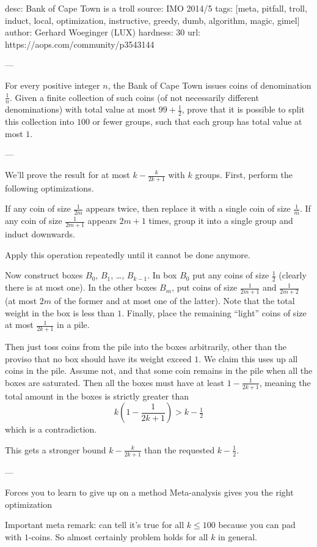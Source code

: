 desc:  Bank of Cape Town is a troll
source:  IMO 2014/5
tags:  [meta, pitfall, troll, induct, local, optimization, instructive, greedy, dumb, algorithm, magic, gimel]
author: Gerhard Woeginger (LUX)
hardness: 30
url: https://aops.com/community/p3543144

---

For every positive integer $n$,
the Bank of Cape Town issues coins of denomination $\frac 1n$.
Given a finite collection of such coins (of not necessarily different denominations)
with total value at most $99 + \frac12$, prove that it is possible to split
this collection into $100$ or fewer groups, such that each group has total value at most $1$.

---

We'll prove the result
for at most $k - \frac{k}{2k+1}$ with $k$ groups.
First, perform the following optimizations.
\begin{itemize}
 \ii If any coin of size $\frac{1}{2m}$ appears twice,
 then replace it with a single coin of size $\frac{1}{m}$.
 \ii If any coin of size $\frac{1}{2m+1}$ appears $2m+1$ times,
 group it into a single group and induct downwards.
\end{itemize}
Apply this operation repeatedly until it cannot be done anymore.

Now construct boxes $B_0$, $B_1$, \dots, $B_{k-1}$.
In box $B_0$ put any coins of size $\tfrac 12$
(clearly there is at most one).
In the other boxes $B_m$, put coins of size
$\frac{1}{2m+1}$ and $\frac{1}{2m+2}$
(at most $2m$ of the former and at most one of the latter).
Note that the total weight in the box is less than $1$.
Finally, place the remaining ``light'' coins of size
at most $\frac{1}{2k+1}$ in a pile.

Then just toss coins from the pile into the boxes arbitrarily,
other than the proviso that no box should have its weight exceed $1$.
We claim this uses up all coins in the pile.
Assume not, and that some coin remains in the pile
when all the boxes are saturated.
Then all the boxes must have at least $1 -\frac{1}{2k+1}$,
meaning the total amount in the boxes is strictly greater than
\[ k \left( 1 - \frac{1}{2k+1} \right) > k - \tfrac 12 \]
which is a contradiction.
\begin{remark*}
This gets a stronger bound $k - \frac{k}{2k+1}$
than the requested $k-\tfrac 12$.
\end{remark*}

---

Forces you to learn to give up on a method
Meta-analysis gives you the right optimization

Important meta remark: can tell it's true for all $k \le 100$
because you can pad with $1$-coins.
So almost certainly problem holds for all $k$ in general.
